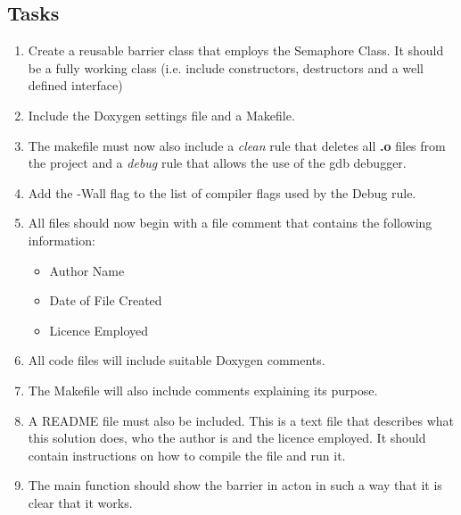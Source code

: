 \documentclass[10pt,a4paper]{article}
\begin{document}
\subsection{Tasks}
\begin{enumerate}
\item Create a reusable barrier class that employs the Semaphore Class. It should be a fully working class (i.e. include constructors, destructors and a well defined interface)
\item  Include the Doxygen settings file and a Makefile.
\item The makefile must now also include a \textit{clean} rule that deletes all \textbf{.o} files from the project and a \textit{debug} rule that allows the use of the gdb debugger. 
\item Add the -Wall flag to the list of compiler flags used by the Debug rule. 
\item All files should now begin with a file comment that contains the following information:
\begin{itemize}
    \item Author Name
    \item Date of File Created
    \item Licence Employed
\end{itemize}
\item All code files will include suitable Doxygen comments.  
\item The Makefile will also include comments explaining its purpose.
\item A README file must also be included.  This is a text file that describes what this solution does, who the author is and the licence employed.  It should contain instructions on how to compile the file and run it.
\item The main function should show the barrier in acton in such a way that it is clear that it works.
\end{enumerate}
\end{document}
